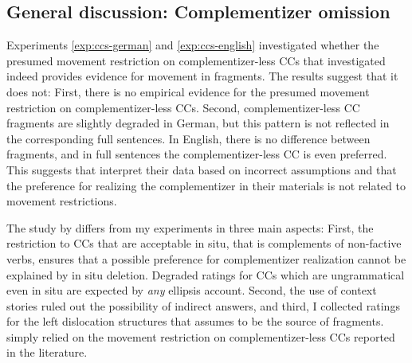 \subsection{General discussion: Complementizer omission}
\begin{sloppypar}
Experiments \ref{exp:ccs-german} and \ref{exp:ccs-english} investigated whether the presumed movement restriction on comple\-men\-tizer-less CCs that \citet{merchant.etal2013} investigated indeed provides evidence for movement in fragments. The results suggest that it does not: First, there is no empirical evidence for the presumed movement restriction on complementizer-less CCs. Second, complementizer-less CC fragments are slightly degraded in German, but this pattern is not reflected in the corresponding full sentences. In English, there is no difference between fragments, and in full sentences the complementizer-less CC is even preferred. This suggests that \citet{merchant.etal2013} interpret their data based on incorrect assumptions and that the preference for realizing the complementizer in their materials is not related to movement restrictions.
\end{sloppypar}

The study by \citet{merchant.etal2013} differs from my experiments in three main aspects: First, the restriction to CCs that are acceptable in situ, that is complements of non-factive verbs, ensures that a possible preference for complementizer realization cannot be explained by in situ deletion. Degraded ratings for CCs which are ungrammatical even in situ are expected by \textit{any} ellipsis account. Second, the use of context stories ruled out the possibility of indirect answers, and third, I collected ratings for the left dislocation structures that \citet{merchant2004} assumes to be the source of fragments. \citet{merchant.etal2013} simply relied on the movement restriction on complementizer-less CCs reported in the literature. 

